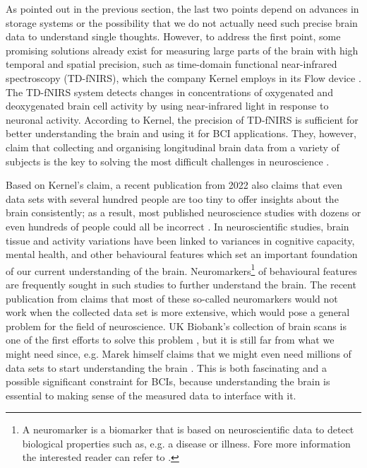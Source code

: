 As pointed out in the previous section, the last two points depend on advances in storage systems or the possibility that we do not actually need such precise brain data to understand single thoughts. However, to address the first point, some promising solutions already exist for measuring large parts of the brain with high temporal and spatial precision, such as time-domain functional near-infrared spectroscopy (TD-fNIRS), which the company Kernel employs in its Flow device \citep{ban_kernel_2021}. The TD-fNIRS system detects changes in concentrations of oxygenated and deoxygenated brain cell activity by using near-infrared light in response to neuronal activity. According to Kernel, the precision of TD-fNIRS is sufficient for better understanding the brain and using it for BCI applications. They, however, claim that collecting and organising longitudinal brain data from a variety of subjects is the key to solving the most difficult challenges in neuroscience \citep{kernel_hello-humanitypdf_nodate}.

\newpage

Based on Kernel's claim, a recent publication from 2022 also claims that even data sets with several hundred people are too tiny to offer insights about the brain consistently; as a result, most published neuroscience studies with dozens or even hundreds of people could all be incorrect \citep{marek_reproducible_2022}. In neuroscientific studies, brain tissue and activity variations have been linked to variances in cognitive capacity, mental health, and other behavioural features which set an important foundation of our current understanding of the brain. Neuromarkers\footnote{A neuromarker is a biomarker that is based on neuroscientific data to detect biological properties such as, e.g. a disease or illness. Fore more information the interested reader can refer to \cite{jollans_neuromarkers_2018}.} of behavioural features are frequently sought in such studies to further understand the brain. The recent publication from \citeauthor{marek_reproducible_2022} claims that most of these so-called neuromarkers would not work when the collected data set is more extensive, which would pose a general problem for the field of neuroscience. UK Biobank's collection of brain scans is one of the first efforts to solve this problem \citep{noauthor_imaging_nodate}, but it is still far from what we might need since, e.g. Marek himself claims that we might even need millions of data sets to start understanding the brain \citep{callaway_can_2022}. This is both fascinating and a possible significant constraint for BCIs, because understanding the brain is essential to making sense of the measured data to interface with it.

